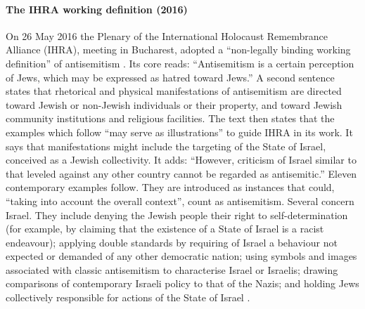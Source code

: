 \paragraph{The IHRA working definition (2016)}
On 26 May 2016 the Plenary of the International Holocaust Remembrance Alliance (IHRA), meeting in Bucharest, adopted a ``non-legally binding working definition'' of antisemitism \citep{ihra2016}. Its core reads: ``Antisemitism is a certain perception of Jews, which may be expressed as hatred toward Jews.'' A second sentence states that rhetorical and physical manifestations of antisemitism are directed toward Jewish or non-Jewish individuals or their property, and toward Jewish community institutions and religious facilities. The text then states that the examples which follow ``may serve as illustrations'' to guide IHRA in its work. It says that manifestations might include the targeting of the State of Israel, conceived as a Jewish collectivity. It adds: ``However, criticism of Israel similar to that leveled against any other country cannot be regarded as antisemitic.'' Eleven contemporary examples follow. They are introduced as instances that could, ``taking into account the overall context'', count as antisemitism. Several concern Israel. They include denying the Jewish people their right to self-determination (for example, by claiming that the existence of a State of Israel is a racist endeavour); applying double standards by requiring of Israel a behaviour not expected or demanded of any other democratic nation; using symbols and images associated with classic antisemitism to characterise Israel or Israelis; drawing comparisons of contemporary Israeli policy to that of the Nazis; and holding Jews collectively responsible for actions of the State of Israel \citep{ihra2016}.

